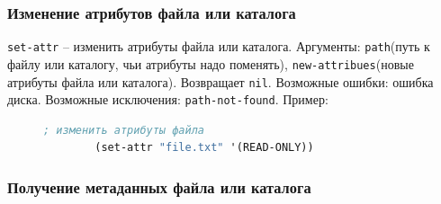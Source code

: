 \subsubsection{Изменение атрибутов файла или каталога}

\texttt{set-attr} -- изменить атрибуты файла или каталога. Аргументы: \texttt{path}(путь к файлу или каталогу, чьи атрибуты надо поменять), \texttt{new-attribues}(новые атрибуты файла или каталога). Возвращает \texttt{nil}. Возможные ошибки: ошибка диска. Возможные исключения: \texttt{path-not-found}. Пример:
\begin{figure}[H]
	\begin{lstlisting}[language=Lisp]		
		; изменить атрибуты файла
		(set-attr "file.txt" '(READ-ONLY))
	\end{lstlisting}
\end{figure}

\subsubsection{Получение метаданных файла или каталога}

